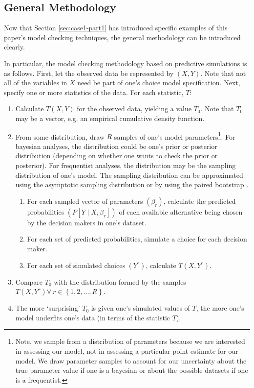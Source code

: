 \documentclass[preprint]{elsarticle}
\begin{document}
\subsection{General Methodology}
\label{sec:general-methodology}
Now that Section \ref{sec:case1-part1} has introduced specific examples of this paper's model checking techniques, the general methodology can be introduced clearly.

In particular, the model checking methodology based on predictive simulations is as follows. First, let the observed data be represented by $\left( X, Y \right)$. Note that not all of the variables in $X$ need be part of one's choice model specification. Next, specify one or more statistics of the data. For each statistic, $T$:
\begin{enumerate}
\item Calculate $T \left( X, Y \right)$ for the observed data, yielding a value $T_0$. Note that $T_0$ may be a vector, e.g. an empirical cumulative density function.

\item From some distribution, draw $R$ samples of one's model parameters\footnote{Note, we sample from a distribution of parameters because we are interested in assessing our model, not in assessing a particular point estimate for our model. We draw parameter samples to account for our uncertainty about the true parameter value if one is a bayesian or about the possible datasets if one is a frequentist.}. For bayesian analyses, the distribution could be one's prior or posterior distribution (depending on whether one wants to check the prior or posterior). For frequentist analyses, the distribution may be the sampling distribution of one's model. The sampling distribution can be approximated using the asymptotic sampling distribution or by using the paired bootstrap \citep{brownstone_bootstrap_2001}.

	\begin{enumerate}
		\item For each sampled vector of parameters $\left( \beta _r \right)$, calculate the predicted probabilities $\left( P \left[ Y \mid X, \beta_r \right] \right)$ of each available alternative being chosen by the decision makers in one's dataset.

		\item For each set of predicted probabilities, simulate a choice for each decision maker.

		\item For each set of simulated choices $\left( Y^r \right)$, calculate $T \left( X, Y^r \right)$.
	\end{enumerate}

\item Compare $T_0$ with the distribution formed by the samples $T \left( X, Y^r \right) \forall \  r \in \left\lbrace 1, 2, ..., R \right\rbrace$.

\item The more  `surprising' $T_0$ is given one's simulated values of $T$, the more one's model underfits one's data (in terms of the statistic $T$).
\end{enumerate}
\end{document}
